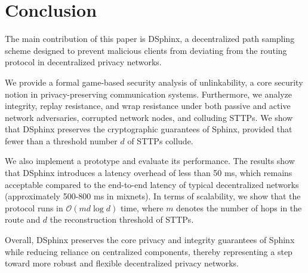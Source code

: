 \section{Conclusion}

The main contribution of this paper is DSphinx, a decentralized path sampling scheme designed to prevent malicious clients from deviating from the routing protocol in decentralized privacy networks.

We provide a formal game-based security analysis of unlinkability, a core security notion in privacy-preserving communication systems. 
Furthermore, we analyze integrity, replay resistance, and wrap resistance under both passive and active network adversaries, corrupted network nodes, and colluding STTPs. 
We show that DSphinx preserves the cryptographic guarantees of Sphinx, provided that fewer than a threshold number $d$ of STTPs collude.

We also implement a prototype and evaluate its performance. 
The results show that DSphinx introduces a latency overhead of less than 50 ms, which remains acceptable compared to the end-to-end latency of typical decentralized networks (approximately 500-800 ms in mixnets).
In terms of scalability, we show that the protocol runs in $\mathcal{O}(md \log d)$ time, where $m$ denotes the number of hops in the route and $d$ the reconstruction threshold of STTPs.

Overall, DSphinx preserves the core privacy and integrity guarantees of Sphinx while reducing reliance on centralized components, thereby representing a step toward more robust and flexible decentralized privacy networks.

